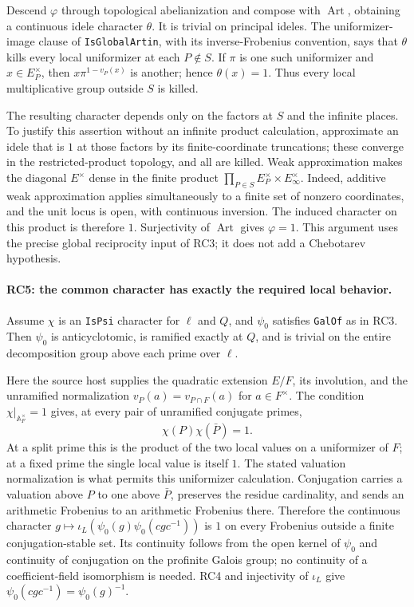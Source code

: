 Descend $\varphi$ through topological abelianization and compose with
$\operatorname{Art}$, obtaining a continuous idele character $\theta$.
It is trivial on principal ideles. The uniformizer-image clause of
\texttt{IsGlobalArtin}, with its inverse-Frobenius convention, says that
$\theta$ kills every local uniformizer at each $P\notin S$.
If $\pi$ is one such uniformizer and $x\in E_P^\times$, then
$x\pi^{1-v_P(x)}$ is another; hence $\theta(x)=1$.
Thus every local multiplicative group outside $S$ is killed.

The resulting character depends only on the factors at $S$ and the
infinite places. To justify this assertion without an infinite product
calculation, approximate an idele that is $1$ at those factors by its
finite-coordinate truncations; these converge in the restricted-product
topology, and all are killed. Weak approximation makes the diagonal
$E^\times$ dense in the finite product
$\prod_{P\in S}E_P^\times\times E_\infty^\times$.
Indeed, additive weak approximation applies simultaneously to a finite
set of nonzero coordinates, and the unit locus is open, with continuous
inversion. The induced character on this product is therefore $1$.
Surjectivity of $\operatorname{Art}$ gives $\varphi=1$.
This argument uses the precise global reciprocity input of RC3; it does
not add a Chebotarev hypothesis.

\paragraph{RC5: the common character has exactly the required local behavior.}
Assume $\chi$ is an \texttt{IsPsi} character for $\ell$ and $Q$, and
$\psi_0$ satisfies \texttt{GalOf} as in RC3. Then $\psi_0$ is
anticyclotomic, is ramified exactly at $Q$, and is trivial on the entire
decomposition group above each prime over $\ell$.

Here the source host supplies the quadratic extension $E/F$, its
involution, and the unramified normalization
$v_P(a)=v_{P\cap F}(a)$ for $a\in F^\times$.
The condition $\chi|_{\mathbb A_F^\times}=1$ gives, at every pair of
unramified conjugate primes,
\[
                  \chi(P)\chi(\bar P)=1.                \tag{RC.5}
\]
At a split prime this is the product of the two local values on a
uniformizer of $F$; at a fixed prime the single local value is itself
$1$. The stated valuation normalization is what permits this uniformizer
calculation. Conjugation carries a valuation above $P$ to one above
$\bar P$, preserves the residue cardinality, and sends an arithmetic
Frobenius to an arithmetic Frobenius there. Therefore the continuous
character
$g\mapsto \iota_L(\psi_0(g)\psi_0(cgc^{-1}))$
is $1$ on every Frobenius outside a finite conjugation-stable set.
Its continuity follows from the open kernel of $\psi_0$ and continuity
of conjugation on the profinite Galois group; no continuity of a
coefficient-field isomorphism is needed. RC4 and injectivity of
$\iota_L$ give $\psi_0(cgc^{-1})=\psi_0(g)^{-1}$.


